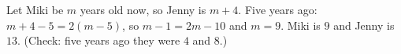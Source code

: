 Let Miki be $m$ years old now, so Jenny is $m+4$. Five years ago: $m+4-5=2(m-5)$, so $m-1=2m-10$ and $m=9$. Miki is $\boxed{9}$ and Jenny is $\boxed{13}$. (Check: five years ago they were $4$ and $8$.)
